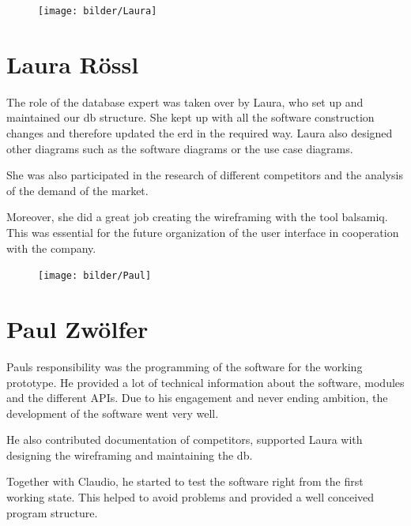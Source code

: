 \begin{figure}
    \texttt{[image: bilder/Laura]}
\end{figure}
\section*{Laura Rössl}
The role of the database expert was taken over by Laura, who set up and maintained our \gls{db} structure. She kept up with all the software construction changes and therefore updated the \gls{erd} in the required way. Laura also designed other diagrams such as the software diagrams or the use case diagrams. 

She was also participated in the research of different competitors and the analysis of the demand of the market.

Moreover, she did a great job creating the wireframing with the tool balsamiq. This was essential for the future organization of the user interface in cooperation with the company.
\begin{figure}
	\texttt{[image: bilder/Paul]}
\end{figure}
\section*{Paul Zwölfer}
Pauls responsibility was the programming of the software for the working prototype. He provided a lot of technical information about the software, modules and the different APIs. Due to his engagement and never ending ambition, the development of the software went very well.

He also contributed documentation of competitors, supported Laura with designing the wireframing and maintaining the \gls{db}.

Together with Claudio, he started to test the software right from the first working state. This helped to avoid problems and provided a well conceived program structure.